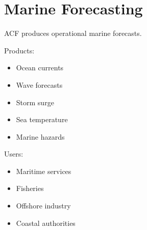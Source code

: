 \section{Marine Forecasting}


ACF produces operational marine forecasts.



Products:


\begin{itemize}

\item Ocean currents

\item Wave forecasts

\item Storm surge

\item Sea temperature

\item Marine hazards

\end{itemize}



Users:


\begin{itemize}

\item Maritime services

\item Fisheries

\item Offshore industry

\item Coastal authorities

\end{itemize}
